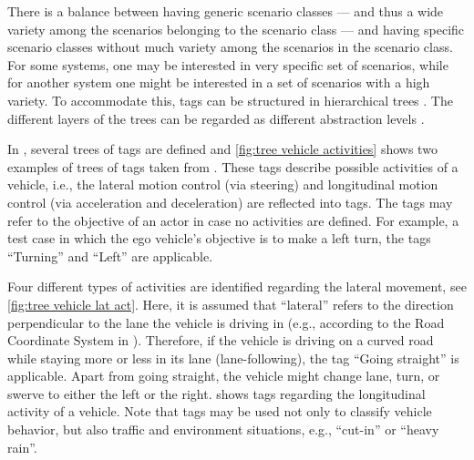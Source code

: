 There is a balance between having generic scenario classes --- and thus a wide variety among the scenarios belonging to the scenario class --- and having specific scenario classes without much variety among the scenarios in the scenario class. For some systems, one may be interested in very specific set of scenarios, while for another system one might be interested in a set of scenarios with a high variety. To accommodate this, tags can be structured in hierarchical trees \cite{molloy2017dynamic, badger2012dynamic}. The different layers of the trees can be regarded as different abstraction levels \cite{Bonnin2014}. 

In \cite{degelder2019scenarioclasses}, several trees of tags are defined and \cref{fig:tree vehicle activities} shows two examples of trees of tags taken from \cite{degelder2019scenarioclasses}. These tags describe possible activities of a vehicle, i.e., the lateral motion control (via steering) and longitudinal motion control (via acceleration and deceleration) are reflected into tags. The tags may refer to the objective of an actor in case no activities are defined. For example, a test case in which the ego vehicle's objective is to make a left turn, the tags ``Turning'' and ``Left'' are applicable. 

Four different types of activities are identified regarding the lateral movement, see \cref{fig:tree vehicle lat act}. Here, it is assumed that ``lateral'' refers to the direction perpendicular to the lane the vehicle is driving in (e.g., according to the Road Coordinate System in \cite{zofka2015datadrivetrafficscenarios}). Therefore, if the vehicle is driving on a curved road while staying more or less in its lane (lane-following), the tag ``Going straight'' is applicable. Apart from going straight, the vehicle might change lane, turn, or swerve to either the left or the right. 
\cbstartd 
{} shows tags regarding the longitudinal activity of a vehicle. Note that tags may be used not only to classify vehicle behavior, but also traffic and environment situations, e.g., ``cut-in'' or ``heavy rain''.
\cbend